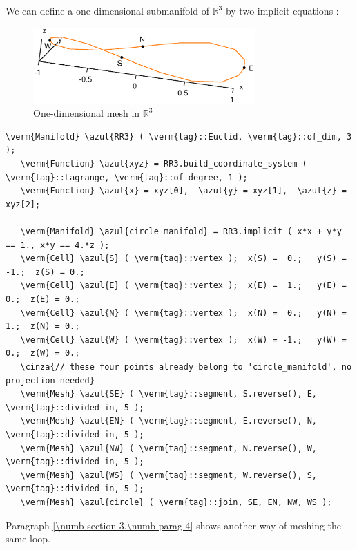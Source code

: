 We can define a one-dimensional submanifold of $ \mathbb{R}^3 $ by two implicit equations :
\medskip

\begin{figure}[ht] \centering
  \includegraphics[width=85mm]{circle-3d}
  \caption{One-dimensional mesh in $ {\mathbb R}^3 $}
  \label{\numb section 2.\numb fig 14}
\end{figure}

\begin{Verbatim}[commandchars=\\\{\},formatcom=\small\tt,frame=single,
   label=main-\ref{\numb section 2.\numb parag 11}.cpp,rulecolor=\color{coment},
   baselinestretch=0.94,framesep=2mm]
   \verm{Manifold} \azul{RR3} ( \verm{tag}::Euclid, \verm{tag}::of_dim, 3 );
   \verm{Function} \azul{xyz} = RR3.build_coordinate_system ( \verm{tag}::Lagrange, \verm{tag}::of_degree, 1 );
   \verm{Function} \azul{x} = xyz[0],  \azul{y} = xyz[1],  \azul{z} = xyz[2];

   \verm{Manifold} \azul{circle_manifold} = RR3.implicit ( x*x + y*y == 1., x*y == 4.*z );
   \verm{Cell} \azul{S} ( \verm{tag}::vertex );  x(S) =  0.;   y(S) = -1.;  z(S) = 0.;
   \verm{Cell} \azul{E} ( \verm{tag}::vertex );  x(E) =  1.;   y(E) =  0.;  z(E) = 0.;
   \verm{Cell} \azul{N} ( \verm{tag}::vertex );  x(N) =  0.;   y(N) =  1.;  z(N) = 0.;
   \verm{Cell} \azul{W} ( \verm{tag}::vertex );  x(W) = -1.;   y(W) =  0.;  z(W) = 0.;
   \cinza{// these four points already belong to 'circle_manifold', no projection needed}
   \verm{Mesh} \azul{SE} ( \verm{tag}::segment, S.reverse(), E, \verm{tag}::divided_in, 5 );
   \verm{Mesh} \azul{EN} ( \verm{tag}::segment, E.reverse(), N, \verm{tag}::divided_in, 5 );
   \verm{Mesh} \azul{NW} ( \verm{tag}::segment, N.reverse(), W, \verm{tag}::divided_in, 5 );
   \verm{Mesh} \azul{WS} ( \verm{tag}::segment, W.reverse(), S, \verm{tag}::divided_in, 5 );
   \verm{Mesh} \azul{circle} ( \verm{tag}::join, SE, EN, NW, WS );
\end{Verbatim}

Paragraph \ref{\numb section 3.\numb parag 4} shows another way of meshing the same loop.


